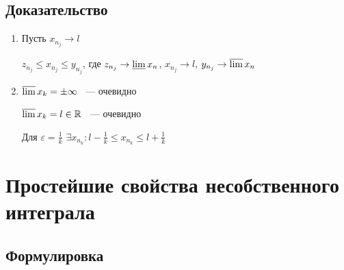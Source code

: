 \documentclass{article}
\begin{document}
        \subsection{Доказательство}
        
            \begin{enumerate}
            
                \item Пусть $x_{n_j} \rightarrow l$
                
                    $z_{n_j} \leq x_{n_j} \leq y_{n_j}$, где $z_{n_j} \rightarrow \varliminf x_n$, $x_{n_j} \rightarrow l$, $y_{n_j} \rightarrow \varlimsup x_n$
                    
                \item $\varlimsup x_k = \pm \infty$ ~--- очевидно
                
                    $\varlimsup x_k = l \in \mathbb{R}$ ~--- очевидно
                    
                    Для $\varepsilon = \frac{1}{k}$ $\exists x_{n_k} : l - \frac{1}{k} \leq x_{n_k} \leq l + \frac{1}{k}$
                    
            \end{enumerate}
            
    \newpage
    
    \section{Простейшие свойства несобственного интеграла}
    
        \subsection{Формулировка}
        
\end{document}
